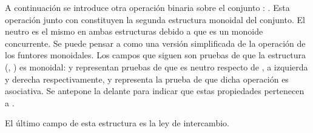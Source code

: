 A continuación se introduce otra operación binaria sobre el conjunto : . Esta operación junto con  constituyen la segunda estructura monoidal del conjunto. El neutro es el mismo en ambas estructuras debido a que es un monoide concurrente. Se puede pensar a  como una versión simplificada de la operación  de los funtores monoidales. Los campos que siguen son pruebas de que la estructura (, ) es monoidal:  y  representan pruebas de que  es neutro respecto de , a izquierda y derecha respectivamente, y  representa la prueba de que dicha operación es asociativa. Se antepone la  delante para indicar que estas propiedades pertenecen a . 

El último campo de esta estructura es la ley de intercambio. %
